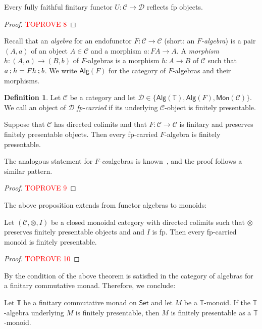 \documentclass[a4paper, UKenglish, numberwithinsect, thm-restate, cleveref, final]{lipics-v2021}
\theoremstyle{plain}
\theoremstyle{definition}
\newtheorem{defn}[theorem]{Definition} \newtheorem{expl}[theorem]{Example} \newtheorem{rem}[theorem]{Remark} \newtheorem{notn}[theorem]{Notation} \newtheorem{assumption}[theorem]{Assumption}
\newcommand{\C}{\ensuremath{\mathcal{C}}}
\newcommand{\T}{\ensuremath{\mathbb{T}}\xspace}
\newcommand{\seq}{\ensuremath{\mathbin{\text{\upshape;}}}}
\newcommand{\D}{\ensuremath{\mathcal{D}}}
\newcommand{\Alg}{\ensuremath{\mathsf{Alg}}}
\newcommand{\Set}{\ensuremath{\mathsf{Set}}\xspace}
\newcommand{\cat}[1]{\ensuremath{\mathcal{#1}}\xspace}
\newcommand{\Mon}{\mathsf{Mon}}
\numberwithin{equation}{section}
\begin{document}
\begin{lemma}\label{lem:ful-faith-fin-reflect-fp}
    Every fully faithful finitary functor \(U \colon \C \rightarrow \cat D\) reflects fp objects.
\end{lemma}

\begin{proof}\textcolor{red}{TOPROVE 8}\end{proof}
Recall that an \emph{algebra} for an endofunctor $F\colon \C\to \C$ (short: an \emph{\(F\)-algebra}) is a pair $(A,a)$ of an object $A\in \C$ and a morphism $a\colon FA\to A$. A \emph{morphism} $h\colon (A,a)\to (B,b)$ of $F$-algebras is a morphism $h\colon A\to B$ of $\C$ such that $a\seq h= Fh\seq b$. We write $\Alg(F)$ for the category of $F$-algebras and their morphisms.

\begin{defn}
  Let \(\C\) be a category and let \(\D \in \{\Alg(\T), \Alg(F), \Mon(\C)\}\).
  We call an object of \(\D\) \emph{fp-carried} if its underlying \(\C\)-object is finitely presentable.
\end{defn}

\begin{proposition}\label{prop:fp-carrier-f-alg}
  Suppose that \(\C\) has directed colimits and that $F\colon \C \to \C$ is finitary and preserves finitely presentable objects.
  Then every fp-carried \(F\)-algebra is finitely presentable.
\end{proposition}
The analogous statement for $F$-\emph{co}algebras is known~\cite[Lemma~3.2]{ap04}, and the proof follows a similar pattern.
\begin{proof}\textcolor{red}{TOPROVE 9}\end{proof}

The above proposition extends from functor algebras to monoids:

\begin{theorem}\label{thm:mon-fp}
  Let \((\C,\otimes,I)\) be a closed monoidal category with directed colimits such that $\otimes$ preserves finitely presentable objects and  and $I$ is fp.
  Then every fp-carried monoid is finitely presentable.
\end{theorem}
\begin{proof}\textcolor{red}{TOPROVE 10}\end{proof}
By  the condition of the above theorem is satisfied in the category of algebras for a finitary commutative monad. Therefore, we conclude:

\begin{corollary}\label{cor:fb-impl-fp}
  Let \(\T\) be a finitary commutative monad on \Set and let $M$ be a $\T$-monoid. If the $\T$-algebra underlying $M$ is finitely presentable, then $M$ is finitely presentable as a $\T$-monoid.
\end{corollary}
\end{document}
